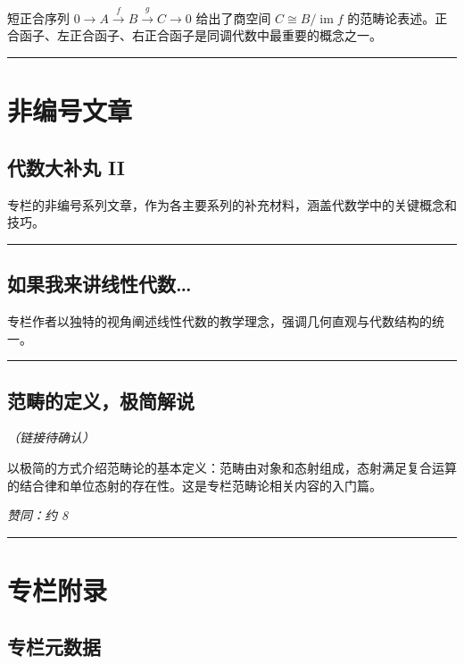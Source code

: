 \documentclass[10pt, openany]{book}
\begin{document}
短正合序列 $0 \to A \xrightarrow{f} B \xrightarrow{g} C \to 0$ 给出了商空间 $C \cong B/\operatorname{im} f$ 的范畴论表述。正合函子、左正合函子、右正合函子是同调代数中最重要的概念之一。

\medskip
\noindent\rule{\textwidth}{0.4pt}

\chapter{非编号文章}

\section{代数大补丸 II}

专栏的非编号系列文章，作为各主要系列的补充材料，涵盖代数学中的关键概念和技巧。

\medskip
\noindent\rule{\textwidth}{0.4pt}

\section{如果我来讲线性代数\ldots}

专栏作者以独特的视角阐述线性代数的教学理念，强调几何直观与代数结构的统一。

\medskip
\noindent\rule{\textwidth}{0.4pt}

\section{范畴的定义，极简解说}

\textit{（链接待确认）}

以极简的方式介绍范畴论的基本定义：范畴由对象和态射组成，态射满足复合运算的结合律和单位态射的存在性。这是专栏范畴论相关内容的入门篇。

\textit{赞同：约 8}

\medskip
\noindent\rule{\textwidth}{0.4pt}

\chapter{专栏附录}

\section{专栏元数据}
\end{document}
